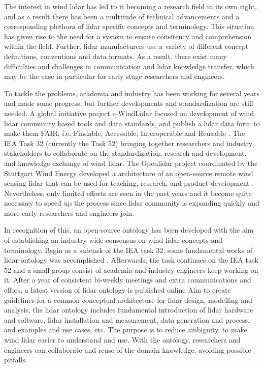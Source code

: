 \documentclass[remotesensing,article,submit,pdftex,moreauthors]{Definitions/mdpi}
\begin{document}
The interest in wind lidar has led to it becoming a research field in its own right, and as a result there has been a multitude of technical advancements and a corresponding plethora of lidar specific concepts and terminology. This situation has given rise to the need for a system to ensure consitency and comprehension within the field.
Further, lidar manufacturers use a variety of different concept definitions, conventions and data formats.
As a result, there exist many difficulties and challenges in communication and lidar knowledge transfer, which may be the case in particular for early stage researchers and engineers.

To tackle the problems, academia and industry has been working for several years and made some progress, but further developments and standardization are still needed. 
A global initiative project e-WindLidar focused on development of wind lidar community based tools and data standards, and publish a lidar data form to make them FAIR, i.e. Findable, Accessible, Interoperable and Reusable \cite{ref-Vasiljevi}. 
The IEA Task 32 (currently the Task 52) bringing together researchers and industry stakeholders to collaborate on the standardization, research and development, and knowledge exchange of wind lidar\cite{ref-Clifton-Schlipf}.
The Openlidar project coordinated by the Stuttgart Wind Energy developed a architecture of an open-source remote wind sensing lidar that can be used for teaching, research, and product development \cite{ref-SWE}.
Nevertheless, only limited efforts are seen in the past years and it become quite necessary to speed up the process since lidar community is expanding quickly and more early researchers and engineers join.

In recognition of this, an open-source ontology has been developed with the aim of establishing an industry-wide consensus on wind lidar concepts and terminology.
Begin as a subtask of the IEA task 32, some fundamental works of lidar ontology was accomplished \cite{ref-Clifton-Costa}. Afterwards, the task continues on the IEA task 52 and a small group consist of academia and industry engineers keep working on it. After a year of consistent bi-weekly meetings and extra communications and effors, a latest version of lidar ontology is published online \cite{ref-OntoWeb}
Aim to create guidelines for a common conceptual architecture for lidar design, modelling and analysis, the lidar ontology includes fundamental introduction of lidar hardware and software, lidar installation and measurement, data generation and process, and examples and use cases, etc. The purpose is to reduce ambiguity, to make wind lidar easier to understand and use. With the ontology, researchers and engineers can collaborate and reuse of the domain knowledge, avoiding possible pitfalls. 
\end{document}
